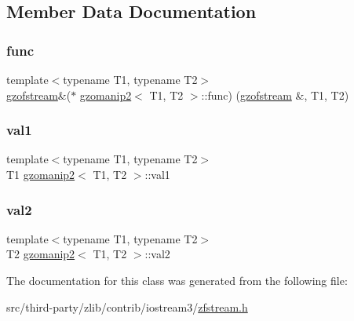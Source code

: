 \subsection{Member Data Documentation}
\mbox{\label{classgzomanip2_a3be14c9a45a72cc79d255dfd5a005c70}} 
\subsubsection{\texorpdfstring{func}{func}}
{\footnotesize\ttfamily template$<$typename T1, typename T2$>$ \\
\mbox{\hyperlink{classgzofstream}{gzofstream}}\&($\ast$ \mbox{\hyperlink{classgzomanip2}{gzomanip2}}$<$ T1, T2 $>$\+::func) (\mbox{\hyperlink{classgzofstream}{gzofstream}} \&, T1, T2)\hspace{0.3cm}{\ttfamily [private]}}

\mbox{\label{classgzomanip2_adf61921aa92449ff5ff148c44cce6f60}} 
\subsubsection{\texorpdfstring{val1}{val1}}
{\footnotesize\ttfamily template$<$typename T1, typename T2$>$ \\
T1 \mbox{\hyperlink{classgzomanip2}{gzomanip2}}$<$ T1, T2 $>$\+::val1\hspace{0.3cm}{\ttfamily [private]}}

\mbox{\label{classgzomanip2_a8a368527f4551da8f107df6043c9fbf5}} 
\subsubsection{\texorpdfstring{val2}{val2}}
{\footnotesize\ttfamily template$<$typename T1, typename T2$>$ \\
T2 \mbox{\hyperlink{classgzomanip2}{gzomanip2}}$<$ T1, T2 $>$\+::val2\hspace{0.3cm}{\ttfamily [private]}}



The documentation for this class was generated from the following file\+:\begin{DoxyCompactItemize}
\item 
src/third-\/party/zlib/contrib/iostream3/\mbox{\hyperlink{_2zfstream_8h}{zfstream.\+h}}\end{DoxyCompactItemize}
